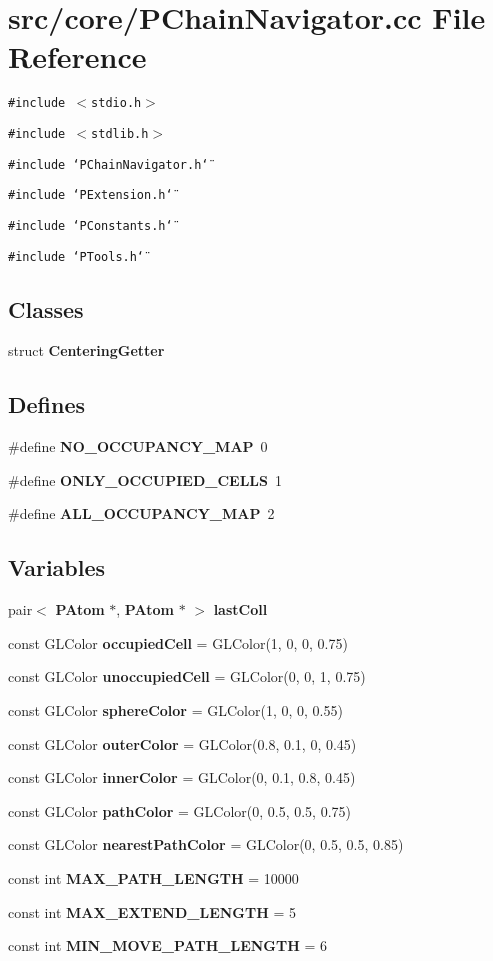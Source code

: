 \section{src/core/PChain\-Navigator.cc File Reference}
\label{PChainNavigator_8cc}


{\tt \#include $<$stdio.h$>$}\par
{\tt \#include $<$stdlib.h$>$}\par
{\tt \#include \char`\"{}PChain\-Navigator.h\char`\"{}}\par
{\tt \#include \char`\"{}PExtension.h\char`\"{}}\par
{\tt \#include \char`\"{}PConstants.h\char`\"{}}\par
{\tt \#include \char`\"{}PTools.h\char`\"{}}\par
\subsection*{Classes}
\begin{CompactItemize}
\item 
struct {\bf Centering\-Getter}
\end{CompactItemize}
\subsection*{Defines}
\begin{CompactItemize}
\item 
\#define {\bf NO\_\-OCCUPANCY\_\-MAP}~0
\item 
\#define {\bf ONLY\_\-OCCUPIED\_\-CELLS}~1
\item 
\#define {\bf ALL\_\-OCCUPANCY\_\-MAP}~2
\end{CompactItemize}
\subsection*{Variables}
\begin{CompactItemize}
\item 
pair$<$ {\bf PAtom} $\ast$, {\bf PAtom} $\ast$ $>$ {\bf last\-Coll}
\item 
const GLColor {\bf occupied\-Cell} = GLColor(1, 0, 0, 0.75)
\item 
const GLColor {\bf unoccupied\-Cell} = GLColor(0, 0, 1, 0.75)
\item 
const GLColor {\bf sphere\-Color} = GLColor(1, 0, 0, 0.55)
\item 
const GLColor {\bf outer\-Color} = GLColor(0.8, 0.1, 0, 0.45)
\item 
const GLColor {\bf inner\-Color} = GLColor(0, 0.1, 0.8, 0.45)
\item 
const GLColor {\bf path\-Color} = GLColor(0, 0.5, 0.5, 0.75)
\item 
const GLColor {\bf nearest\-Path\-Color} = GLColor(0, 0.5, 0.5, 0.85)
\item 
const int {\bf MAX\_\-PATH\_\-LENGTH} = 10000
\item 
const int {\bf MAX\_\-EXTEND\_\-LENGTH} = 5
\item 
const int {\bf MIN\_\-MOVE\_\-PATH\_\-LENGTH} = 6
\end{CompactItemize}


